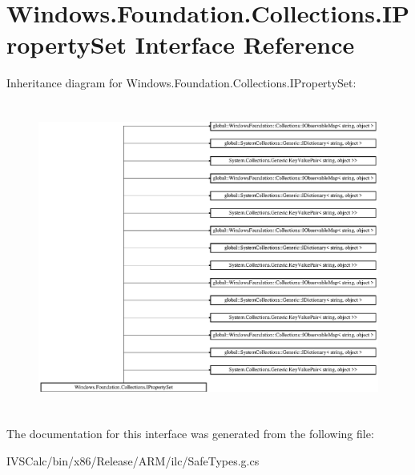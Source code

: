 \hypertarget{interface_windows_1_1_foundation_1_1_collections_1_1_i_property_set}{}\section{Windows.\+Foundation.\+Collections.\+I\+Property\+Set Interface Reference}
\label{interface_windows_1_1_foundation_1_1_collections_1_1_i_property_set}
Inheritance diagram for Windows.\+Foundation.\+Collections.\+I\+Property\+Set\+:\begin{figure}[H]
\begin{center}
\leavevmode
\includegraphics[height=10.205011cm]{interface_windows_1_1_foundation_1_1_collections_1_1_i_property_set}
\end{center}
\end{figure}


The documentation for this interface was generated from the following file\+:\begin{DoxyCompactItemize}
\item 
I\+V\+S\+Calc/bin/x86/\+Release/\+A\+R\+M/ilc/Safe\+Types.\+g.\+cs\end{DoxyCompactItemize}
